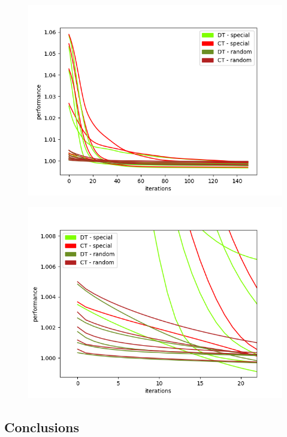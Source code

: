 \documentclass[thesis=M,english]{FITthesis}[2012/10/20]
\begin{document}
\begin{figure}
\centering
\begin{minipage}{.8\textwidth}
  \centering
  \includegraphics[width=1\linewidth]{img/ex1/2/all.png}
  \label{fig:all}
\end{minipage}
\begin{minipage}{.8\textwidth}
  \centering
  \includegraphics[width=.95\linewidth]{img/ex1/2/random.png}
  \label{fig:random}
\end{minipage}
\end{figure}  

\subsection{ Conclusions }
\end{document}
